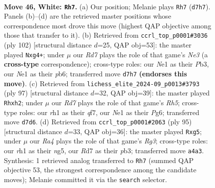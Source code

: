 \documentclass[11pt]{article}
\begin{document}
\clearpage

\begin{figure}[p]\centering
\begin{subfigure}{0.46\textwidth}\centering
\resizebox{\linewidth}{!}{%
\newchessgame
\chessboard[
  setfen={8/p2R4/8/2p1k2P/R3pp2/8/1P6/3KN2r w - - 4 46},
  showmover=false,
  pgfstyle=straightmove, color=movearrow, markmove={d7-h7}
]}
\caption{}
\end{subfigure}\hfill
\begin{subfigure}{0.46\textwidth}\centering
\resizebox{\linewidth}{!}{%
\newchessgame
\chessboard[
  setfen={8/p7/1p3k2/1R4p1/4K1p1/1P2N3/1r6/8 w - - 0 52},
  showmover=false,
  pgfstyle=straightmove, color=movearrow, markmove={e3-g4}
]}
\caption{}
\end{subfigure}
\\[4pt]
\begin{subfigure}{0.46\textwidth}\centering
\resizebox{\linewidth}{!}{%
\newchessgame
\chessboard[
  setfen={7k/p4Q2/6p1/6P1/7r/1P6/P3r2P/6K1 b - - 9 49},
  showmover=false,
  pgfstyle=straightmove, color=movearrow, markmove={h4-h2}
]}
\caption{}
\end{subfigure}\hfill
\begin{subfigure}{0.46\textwidth}\centering
\resizebox{\linewidth}{!}{%
\newchessgame
\chessboard[
  setfen={8/p3R3/6rP/P1p3N1/2P1n3/KP2k3/8/8 b - - 2 48},
  showmover=false,
  pgfstyle=straightmove, color=movearrow, markmove={g6-g5}
]}
\caption{}
\end{subfigure}
\caption{\textbf{Move 46, White: \texttt{Rh7}.} (a) Our position; Melanie plays \texttt{Rh7} (\texttt{d7h7}). Panels (b)--(d) are the retrieved master positions whose correspondence most drove this move (highest QAP objective among those that transfer to it). (b) Retrieved from \texttt{ccrl\_top\_p0001\#3036} (ply 102) [structural distance $d$=25, QAP obj=53]: the master played \texttt{Nxg4+}; under $\mu$ our \emph{Rd7} plays the role of that game's \emph{Ne3} (a \textbf{cross-type} correspondence); cross-type roles: our \emph{N}e1 as their \emph{P}b3, our \emph{N}e1 as their \emph{p}b6; transferred move \texttt{d7h7} \textbf{(endorses this move)}. (c) Retrieved from \texttt{lichess\_elite\_2024-09\_p0013\#3793} (ply 97) [structural distance $d$=32, QAP obj=39]: the master played \texttt{Rhxh2}; under $\mu$ our \emph{Rd7} plays the role of that game's \emph{Rh5}; cross-type roles: our \emph{r}h1 as their \emph{q}f7, our \emph{N}e1 as their \emph{P}g6; transferred move \texttt{d7d6}. (d) Retrieved from \texttt{ccrl\_top\_p0001\#2063} (ply 95) [structural distance $d$=33, QAP obj=36]: the master played \texttt{Rxg5}; under $\mu$ our \emph{Ra4} plays the role of that game's \emph{Rg3}; cross-type roles: our \emph{r}h1 as their \emph{n}g5, our \emph{R}d7 as their \emph{p}b3; transferred move \texttt{a4a3}. Synthesis: 1 retrieved analog transferred to \texttt{Rh7} (summed QAP objective 53, the strongest correspondence among the candidate moves); Melanie committed it via the \texttt{search} selector.}
\label{fig:thought-m90}
\end{figure}
\end{document}
